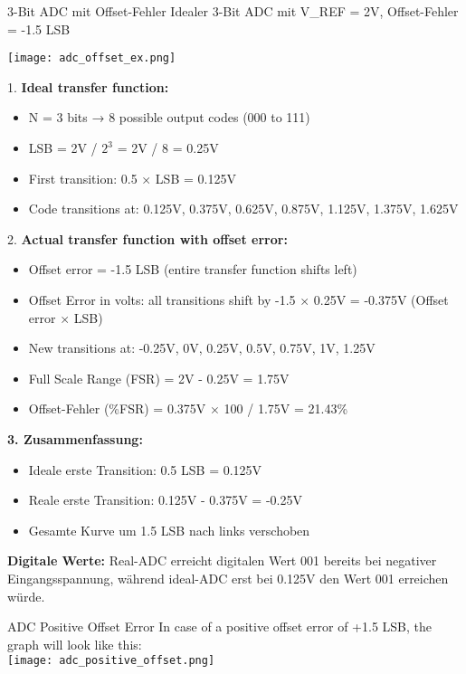 \begin{example2}{3-Bit ADC mit Offset-Fehler}
    Idealer 3-Bit ADC mit V\_REF = 2V, Offset-Fehler = -1.5 LSB
    
    \tcblower

    \texttt{[image: adc\_offset\_ex.png]}

    1. \textbf{Ideal transfer function:}
    \begin{itemize}
        \item N = 3 bits → 8 possible output codes (000 to 111)
        \item LSB = 2V / $2^3$ = 2V / 8 = 0.25V
        \item First transition: 0.5 × LSB = 0.125V
        \item Code transitions at: 0.125V, 0.375V, 0.625V, 0.875V, 1.125V, 1.375V, 1.625V
    \end{itemize}

    2. \textbf{Actual transfer function with offset error:}
    \begin{itemize}
        \item Offset error = -1.5 LSB (entire transfer function shifts left)
        \item Offset Error in volts: all transitions shift by -1.5 × 0.25V = -0.375V (Offset error $\times$ LSB)
        \item New transitions at: -0.25V, 0V, 0.25V, 0.5V, 0.75V, 1V, 1.25V
        \item Full Scale Range (FSR) = 2V - 0.25V = 1.75V
        \item Offset-Fehler (\%FSR) = 0.375V $\times$ 100 / 1.75V = 21.43\%
    \end{itemize}

    
    \textbf{3. Zusammenfassung:}
    \begin{itemize}
        \item Ideale erste Transition: 0.5 LSB = 0.125V
        \item Reale erste Transition: 0.125V - 0.375V = -0.25V
        \item Gesamte Kurve um 1.5 LSB nach links verschoben
    \end{itemize}
    
    \textbf{Digitale Werte:}
    Real-ADC erreicht digitalen Wert 001 bereits bei negativer Eingangsspannung, während ideal-ADC erst bei 0.125V den Wert 001 erreichen würde.
\end{example2}

\begin{example2}{ADC Positive Offset Error} In case of a positive offset error of +1.5 LSB, the graph will look like this:\\
\texttt{[image: adc\_positive\_offset.png]}
\end{example2}


